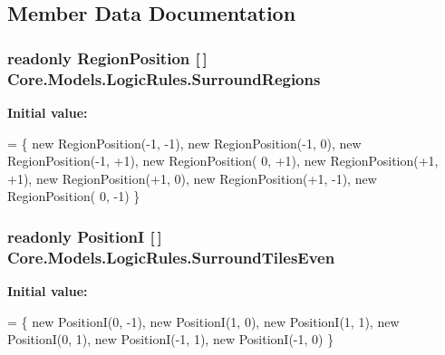 \subsection{Member Data Documentation}
\hypertarget{classCore_1_1Models_1_1LogicRules_a42380b97e68c7128580776742ef94e56}{
\subsubsection[{Surround\-Regions}]{\setlength{\rightskip}{0pt plus 5cm}readonly {\bf Region\-Position} \mbox{[}$\,$\mbox{]} Core.\-Models.\-Logic\-Rules.\-Surround\-Regions\hspace{0.3cm}{\ttfamily [static]}}}\label{classCore_1_1Models_1_1LogicRules_a42380b97e68c7128580776742ef94e56}
{\bfseries Initial value\-:}
\begin{DoxyCode}
=
            \{
                \textcolor{keyword}{new} RegionPosition(-1, -1),
                \textcolor{keyword}{new} RegionPosition(-1,  0),
                \textcolor{keyword}{new} RegionPosition(-1, +1),
                \textcolor{keyword}{new} RegionPosition( 0, +1),
                \textcolor{keyword}{new} RegionPosition(+1, +1),
                \textcolor{keyword}{new} RegionPosition(+1,  0),
                \textcolor{keyword}{new} RegionPosition(+1, -1),
                \textcolor{keyword}{new} RegionPosition( 0, -1)
        \}
\end{DoxyCode}
\hypertarget{classCore_1_1Models_1_1LogicRules_a3d587d8f781d3b37c26c501d003f3d4d}{
\subsubsection[{Surround\-Tiles\-Even}]{\setlength{\rightskip}{0pt plus 5cm}readonly {\bf Position\-I} \mbox{[}$\,$\mbox{]} Core.\-Models.\-Logic\-Rules.\-Surround\-Tiles\-Even\hspace{0.3cm}{\ttfamily [static]}}}\label{classCore_1_1Models_1_1LogicRules_a3d587d8f781d3b37c26c501d003f3d4d}
{\bfseries Initial value\-:}
\begin{DoxyCode}
=
            \{
                \textcolor{keyword}{new} PositionI(0, -1),
                \textcolor{keyword}{new} PositionI(1, 0),
                \textcolor{keyword}{new} PositionI(1, 1),
                \textcolor{keyword}{new} PositionI(0, 1),
                \textcolor{keyword}{new} PositionI(-1, 1),
                \textcolor{keyword}{new} PositionI(-1, 0)
            \}
\end{DoxyCode}
